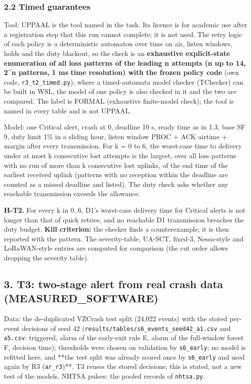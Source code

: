 \subsubsection*{2.2 Timed guarantees}

Tool: UPPAAL is the tool named in the task. Its licence is for academic use after a registration step that this run cannot complete; it is not used. The retry logic of each policy is a deterministic automaton over time on air, listen windows, holds and the duty blackout, so the check is an \textbf{exhaustive explicit-state enumeration of all loss patterns of the leading n attempts (n up to 14, 2\textasciicircum{}n patterns, 1 ms time resolution) with the frozen policy code} (own code, \texttt{r3\_t2\_timed.py}); where a timed-automata model checker (TChecker) can be built in WSL, the model of one policy is also checked in it and the two are compared. The label is FORMAL (exhaustive finite-model check); the tool is named in every table and is not UPPAAL.

Model: one Critical alert, crash at 0, deadline 10 s, ready time as in 1.3, base SF 9, duty limit 1\% in a sliding hour, listen window PROC + ACK airtime + margin after every transmission. For k = 0 to 6, the worst-case time to delivery under at most k consecutive lost attempts is the largest, over all loss patterns with no run of more than k consecutive lost uplinks, of the end time of the earliest received uplink (patterns with no reception within the deadline are counted as a missed deadline and listed). The duty check asks whether any reachable transmission exceeds the allowance.

\textbf{H-T2.} For every k in 0..6, D1's worst-case delivery time for Critical alerts is not longer than that of quick retries, and no reachable D1 transmission breaches the duty budget. \textbf{Kill criterion:} the checker finds a counterexample; it is then reported with the pattern. The severity-table, UA-SCT, fixed-3, Nessa-style and LoRaWAN-style entries are computed for comparison (the cut order allows dropping the severity table).

\subsection*{3. T3: two-stage alert from real crash data (MEASURED\_SOFTWARE)}

Data: the de-duplicated VZCrash test split (24,022 events) with the stored per-event decisions of seed 42 (\texttt{results/tables/s6\_events\_seed42\_a1.csv} and \texttt{a5.csv}: triggered, alarm of the early-exit rule E, alarm of the full-window forest F, decision time); thresholds were chosen on validation by \texttt{s6\_early}; no model is refitted here, and **the test split was already scored once by \texttt{s6\_early} and used again by R3 (\texttt{ar\_r3})**. T3 reuses the stored decisions; this is stated, not a new test of the models. NHTSA pulses: the pooled records of \texttt{nhtsa.py}.

